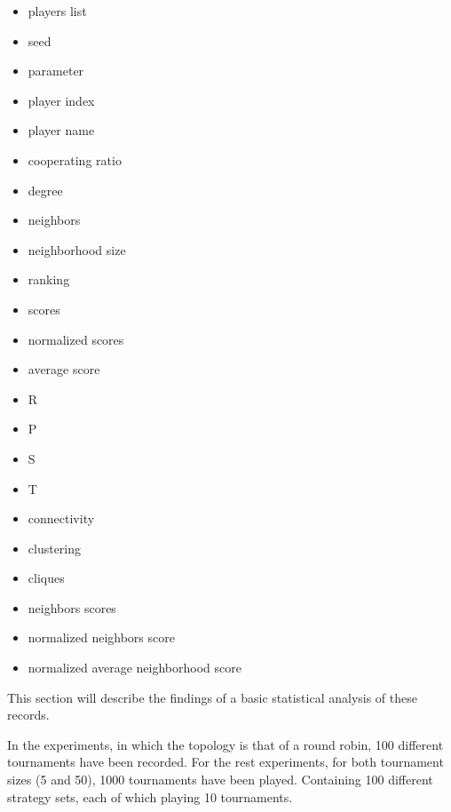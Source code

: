 \begin{multicols}{3}
	\begin{itemize}
		\item players list
		\item seed
		\item parameter
		\item player index
		\item player name
		\item cooperating ratio
		\item degree
		\item neighbors
		\item neighborhood size
		\item ranking
		\item scores
		\item normalized scores
		\item average score
		\item R
		\item P
		\item S
		\item T
		\item connectivity
		\item clustering
		\item cliques
		\item neighbors scores
		\item normalized neighbors score
		\item normalized average neighborhood score
	\end{itemize}
\end{multicols}

This section will describe the findings of a basic statistical analysis of these
records.

In the experiments, in which the topology is that of a round robin,
100 different tournaments have been recorded.
For the rest experiments, for both tournament sizes (5 and 50),
1000 tournaments have been played. Containing 100 different strategy sets, each of
which playing 10 tournaments.

